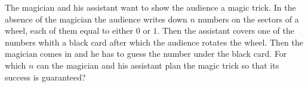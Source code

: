\problem
The magician and his assistant want to show the audience a magic trick.
In the absence of the magician the audience writes down $n$ numbers
on the sectors of a wheel, each of them equal to either $0$ or $1$.
Then the assistant covers one of the numbers whith a black card after which
the audience rotates the wheel.
Then the magician comes in and he has to guess the number under the black card.
For which $n$ can the magician and his assistant plan the magic trick so that
its success is guaranteed?
\solution
\endproblem
